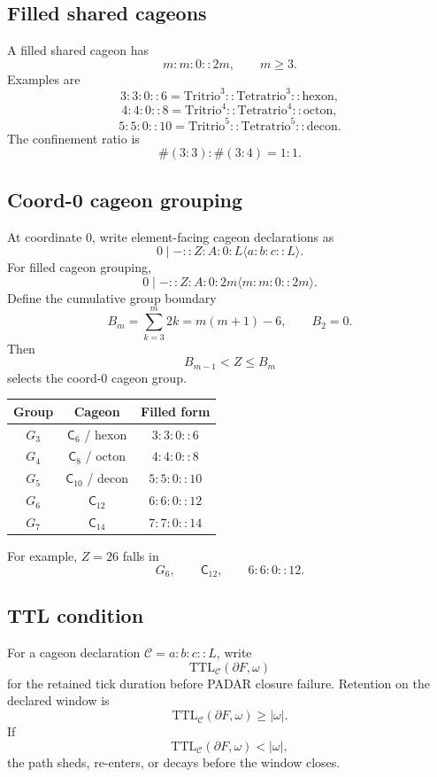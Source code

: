 \subsection{Filled shared cageons}\label{subsec:filled-shared-cageons}
A filled shared cageon has
\[
m:m:0::2m,
\qquad
m\ge3.
\]
Examples are
\[
3:3:0::6
=
\mathrm{Tritrio}^{3}::\mathrm{Tetratrio}^{3}::\mathrm{hexon},
\]
\[
4:4:0::8
=
\mathrm{Tritrio}^{4}::\mathrm{Tetratrio}^{4}::\mathrm{octon},
\]
\[
5:5:0::10
=
\mathrm{Tritrio}^{5}::\mathrm{Tetratrio}^{5}::\mathrm{decon}.
\]
The confinement ratio is
\[
\#(3:3):\#(3:4)=1:1.
\]

\subsection{Coord-0 cageon grouping}\label{subsec:coord-zero-cageon-grouping}
At coordinate \(0\), write element-facing cageon declarations as
\[
0\mid-::Z:A:0:L\langle a:b:c::L\rangle.
\]
For filled cageon grouping,
\[
0\mid-::Z:A:0:2m\langle m:m:0::2m\rangle.
\]
Define the cumulative group boundary
\[
B_m=\sum_{k=3}^{m}2k=m(m+1)-6,
\qquad
B_2=0.
\]
Then
\[
B_{m-1}<Z\le B_m
\]
selects the coord-0 cageon group.

\begin{center}
\begin{tabular}{ccc}
\toprule
Group & Cageon & Filled form\\
\midrule
\(G_3\) & \(\mathsf C_6\) / hexon & \(3:3:0::6\)\\
\(G_4\) & \(\mathsf C_8\) / octon & \(4:4:0::8\)\\
\(G_5\) & \(\mathsf C_{10}\) / decon & \(5:5:0::10\)\\
\(G_6\) & \(\mathsf C_{12}\) & \(6:6:0::12\)\\
\(G_7\) & \(\mathsf C_{14}\) & \(7:7:0::14\)\\
\bottomrule
\end{tabular}
\end{center}
For example, \(Z=26\) falls in
\[
G_6,
\qquad
\mathsf C_{12},
\qquad
6:6:0::12.
\]

\subsection{TTL condition}\label{subsec:cageon-ttl-condition}
For a cageon declaration \(\mathcal C=a:b:c::L\), write
\[
\mathrm{TTL}_{\mathcal C}(\partial F,\omega)
\]
for the retained tick duration before PADAR closure failure. Retention on the declared window is
\[
\mathrm{TTL}_{\mathcal C}(\partial F,\omega)\ge |\omega|.
\]
If
\[
\mathrm{TTL}_{\mathcal C}(\partial F,\omega)<|\omega|,
\]
the path sheds, re-enters, or decays before the window closes.

